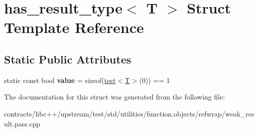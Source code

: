 \hypertarget{structhas__result__type}{}\section{has\+\_\+result\+\_\+type$<$ T $>$ Struct Template Reference}
\label{structhas__result__type}
\subsection*{Static Public Attributes}
\begin{DoxyCompactItemize}
\item 
\mbox{\label{structhas__result__type_ab17e3411709ec6acef1e88ec4635b4ec}} 
static const bool {\bfseries value} = sizeof(\mbox{\hyperlink{structtest}{test}}$<$\mbox{\hyperlink{struct_t}{T}}$>$(0)) == 1
\end{DoxyCompactItemize}


The documentation for this struct was generated from the following file\+:\begin{DoxyCompactItemize}
\item 
contracts/libc++/upstream/test/std/utilities/function.\+objects/refwrap/weak\+\_\+result.\+pass.\+cpp\end{DoxyCompactItemize}
